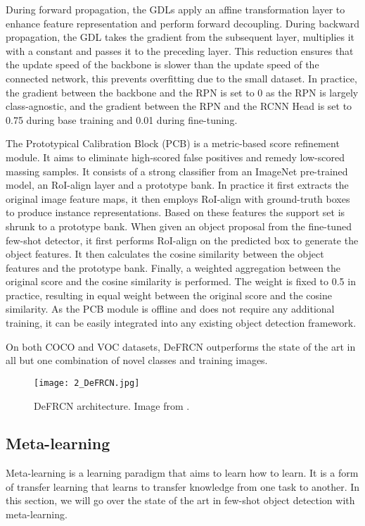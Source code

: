 During forward propagation, the GDLs apply an affine transformation layer to enhance feature representation and perform forward decoupling. During backward propagation, the GDL takes the gradient from the subsequent layer, multiplies it with a constant and passes it to the preceding layer. This reduction ensures that the update speed of the backbone is slower than the update speed of the connected network, this prevents overfitting due to the small dataset. In practice, the gradient between the backbone and the RPN is set to 0 as the RPN is largely class-agnostic, and the gradient between the RPN and the RCNN Head is set to 0.75 during base training and 0.01 during fine-tuning.

The Prototypical Calibration Block (PCB) is a metric-based score refinement module. It aims to eliminate high-scored false positives and remedy low-scored massing samples. It consists of a strong classifier from an ImageNet pre-trained model, an RoI-align layer and a prototype bank. In practice it first extracts the original image feature maps, it then employs RoI-align with ground-truth boxes to produce instance representations. Based on these features the support set is shrunk to a prototype bank. When given an object proposal from the fine-tuned few-shot detector, it first performs RoI-align on the predicted box to generate the object features. It then calculates the cosine similarity between the object features and the prototype bank. Finally, a weighted aggregation between the original score and the cosine similarity is performed. The weight is fixed to 0.5 in practice, resulting in equal weight between the original score and the cosine similarity. As the PCB module is offline and does not require any additional training, it can be easily integrated into any existing object detection framework.

On both COCO and VOC datasets, DeFRCN outperforms the state of the art in all but one combination of novel classes and training images.

\begin{figure}[h]
	\centering
	\texttt{[image: 2\_DeFRCN.jpg]}
	\caption{\label{fig:2_DeFRCN} DeFRCN architecture. Image from \citet{DeFRCN}.}
\end{figure}

\subsection{Meta-learning}
Meta-learning is a learning paradigm that aims to learn how to learn. It is a form of transfer learning that learns to transfer knowledge from one task to another. In this section, we will go over the state of the art in few-shot object detection with meta-learning.


